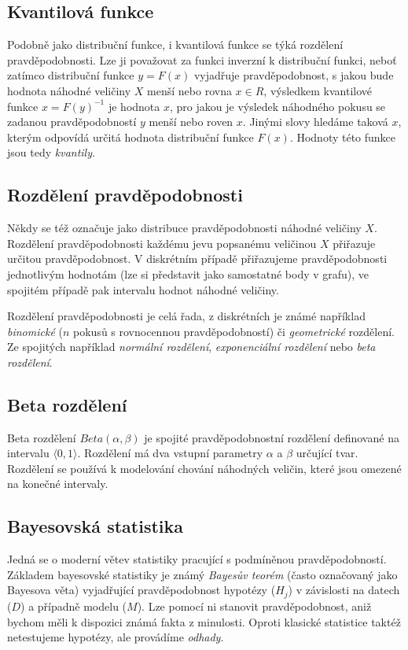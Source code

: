 \documentclass[thesis=M,czech]{FITthesis}[2014/05/07]
\begin{document}
\subsection{Kvantilová funkce}
\label{icdf}
\cite{pst2} Podobně jako distribuční funkce, i kvantilová funkce se týká rozdělení pravděpodobnosti. Lze ji považovat za funkci inverzní k distribuční funkci, neboť zatímco distribuční funkce $y = F(x)$ vyjadřuje pravděpodobnost, s jakou bude hodnota náhodné veličiny $X$ menší nebo rovna $x \in R$, výsledkem kvantilové funkce $x = F(y)^{-1}$ je hodnota $x$, pro jakou je výsledek náhodného pokusu se zadanou pravděpodobností $y$ menší nebo roven $x$. Jinými slovy hledáme taková $x$, kterým odpovídá určitá hodnota distribuční funkce $F(x)$. Hodnoty této funkce jsou tedy \emph{kvantily}.

\subsection{Rozdělení pravděpodobnosti}
\label{distr}
Někdy se též označuje jako distribuce pravděpodobnosti náhodné veličiny $X$. 
Rozdělení pravděpodobnosti každému jevu popsanému veličinou $X$ přiřazuje určitou pravděpodobnost. V diskrétním případě přiřazujeme pravděpodobnosti jednotlivým hodnotám (lze si představit jako samostatné body v grafu), ve spojitém případě pak intervalu hodnot náhodné veličiny. 

Rozdělení pravděpodobnosti je celá řada, z diskrétních je známé například \emph{binomické} ($n$ pokusů s rovnocennou pravděpodobností) či \emph{geometrické} rozdělení. Ze spojitých například \emph{normální rozdělení}, \emph{exponenciální rozdělení} nebo \emph{beta rozdělení}.

\subsection{Beta rozdělení}
\label{beta}
Beta rozdělení ${Beta}(\alpha, \beta)$ je spojité pravděpodobnostní rozdělení definované na intervalu $\langle0,1\rangle$. Rozdělení má dva vstupní parametry $\alpha$ a $\beta$ určující tvar. Rozdělení se používá k modelování chování náhodných veličin, které jsou omezené na konečné intervaly. 

\subsection{Bayesovská statistika}
Jedná se o moderní větev statistiky pracující s podmíněnou pravděpodobností. Základem bayesovské statistiky je známý \emph{Bayesův teorém} (často označovaný jako Bayesova věta) vyjadřující pravděpodobnost hypotézy ($H_j$) v závislosti na datech ($D$) a případně modelu ($M$). Lze pomocí ni stanovit pravděpodobnost, aniž bychom měli k dispozici známá fakta z minulosti. Oproti klasické statistice taktéž netestujeme hypotézy, ale provádíme \emph{odhady}. 
\end{document}
